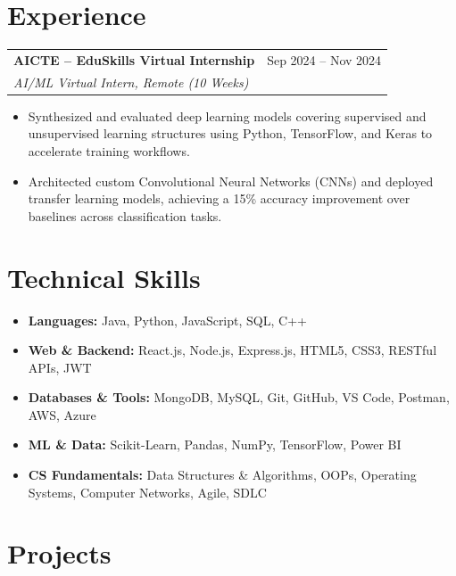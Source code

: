 \documentclass[10pt, a4paper]{article}
\begin{document}
\section*{Experience}
\vspace{1pt}
\begin{tabularx}{\textwidth}{@{}X r@{}}
  \textbf{AICTE – EduSkills Virtual Internship} & Sep 2024 – Nov 2024 \\
  \textit{AI/ML Virtual Intern, Remote (10 Weeks)} & \\
\end{tabularx}
\begin{itemize}
  \item Synthesized and evaluated deep learning models covering supervised and unsupervised learning structures using Python, TensorFlow, and Keras to accelerate training workflows.
  \item Architected custom Convolutional Neural Networks (CNNs) and deployed transfer learning models, achieving a 15\% accuracy improvement over baselines across classification tasks.
\end{itemize}

\section*{Technical Skills}
\vspace{1pt}
\begin{itemize}
  \item \textbf{Languages:} Java, Python, JavaScript, SQL, C++
  \item \textbf{Web \& Backend:} React.js, Node.js, Express.js, HTML5, CSS3, RESTful APIs, JWT
  \item \textbf{Databases \& Tools:} MongoDB, MySQL, Git, GitHub, VS Code, Postman, AWS, Azure
  \item \textbf{ML \& Data:} Scikit-Learn, Pandas, NumPy, TensorFlow, Power BI
  \item \textbf{CS Fundamentals:} Data Structures \& Algorithms, OOPs, Operating Systems, Computer Networks, Agile, SDLC
\end{itemize}

\section*{Projects}
\vspace{1pt}
\end{document}
